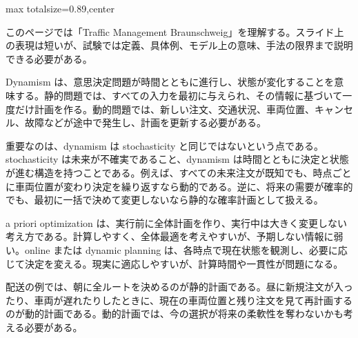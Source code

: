 \begin{minipage}[t]{0.58\textwidth}
\begin{adjustbox}{max totalsize={\textwidth}{0.89\textheight},center}
\begin{minipage}{\textwidth}\scriptsize
{}このページでは「Traffic Management Braunschweig」を理解する。スライド上の表現は短いが、試験では定義、具体例、モデル上の意味、手法の限界まで説明できる必要がある。\par
Dynamism は、意思決定問題が時間とともに進行し、状態が変化することを意味する。静的問題では、すべての入力を最初に与えられ、その情報に基づいて一度だけ計画を作る。動的問題では、新しい注文、交通状況、車両位置、キャンセル、故障などが途中で発生し、計画を更新する必要がある。\par
重要なのは、dynamism は stochasticity と同じではないという点である。stochasticity は未来が不確実であること、dynamism は時間とともに決定と状態が進む構造を持つことである。例えば、すべての未来注文が既知でも、時点ごとに車両位置が変わり決定を繰り返すなら動的である。逆に、将来の需要が確率的でも、最初に一括で決めて変更しないなら静的な確率計画として扱える。\par
a priori optimization は、実行前に全体計画を作り、実行中は大きく変更しない考え方である。計算しやすく、全体最適を考えやすいが、予期しない情報に弱い。online または dynamic planning は、各時点で現在状態を観測し、必要に応じて決定を変える。現実に適応しやすいが、計算時間や一貫性が問題になる。\par
配送の例では、朝に全ルートを決めるのが静的計画である。昼に新規注文が入ったり、車両が遅れたりしたときに、現在の車両位置と残り注文を見て再計画するのが動的計画である。動的計画では、今の選択が将来の柔軟性を奪わないかも考える必要がある。\par

\end{minipage}
\end{adjustbox}
\end{minipage}
